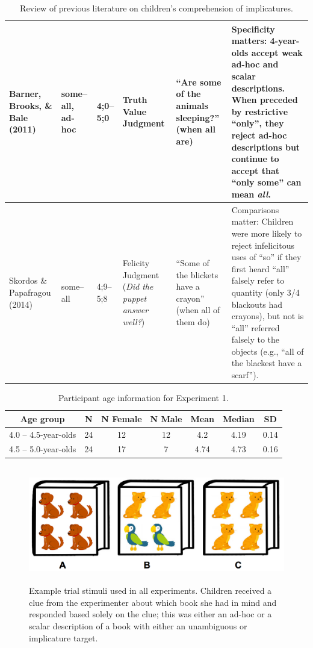 \documentclass[man]{apa2}
\begin{document}
{\begin{landscape}
\begin{table}[!ht]
\begin{tabular}{| p{2.2cm} | p{2cm} | p{1.69cm} | p{4.5cm} | p{5cm} | p{7.2cm} |}
Barner, Brooks, \& Bale (2011) & some--all, ad-hoc & 4;0--5;0 &Truth Value Judgment & ``Are some of the animals sleeping?'' (when all are) & Specificity matters: 4-year-olds accept weak ad-hoc and scalar descriptions. When preceded by restrictive ``only'', they reject ad-hoc descriptions but continue to accept that ``only some'' can mean \emph{all}.\\ \hline
\parbox[t]{2.2cm}{Skordos \&\\Papafragou (2014)} & some--all & 4;9--5;8 & Felicity Judgment (\textit{Did the puppet answer well?}) & ``Some of the blickets have a crayon'' (when all of them do)  & Comparisons matter: Children were more likely to reject infelicitous uses of ``so'' if they first heard ``all'' falsely refer to quantity (only 3/4 blackouts had crayons), but not is ``all'' referred falsely to the objects (e.g., ``all of the blackest have a scarf'').\\ \hline \end{tabular}
\caption{\label{tab:lit_review}Review of previous literature on children's comprehension of implicatures.}
\end{table}
\end{landscape}
\restoregeometry

\begin{table}[tb]
\centering
\begin{tabular}{ccccccc}
\hline
{\bf Age group} & {\bf N} & {\bf N Female} & {\bf N Male} & {\bf Mean} & {\bf Median} & {\bf SD} \\
\hline
4.0 -- 4.5-year-olds & 24 & 12 & 12 & 4.2 & 4.19 & 0.14 \\
4.5 -- 5.0-year-olds & 24 & 17 & 7 & 4.74 & 4.73 & 0.16\\
\hline
\end{tabular}
\caption{\label{tab:exp_1_demo}Participant age information for Experiment 1.}
\end{table}

\begin{figure}
 \begin{center}
  \includegraphics[height=2in]{figures/implicatures_demo_letters.png}
  \caption{\label{fig:demo} Example trial stimuli used in all experiments. Children received a clue from the experimenter about which book she had in mind and responded based solely on the clue; this was either an ad-hoc or a scalar description of a book with either an unambiguous or implicature target.}
 \end{center}
\end{figure}

}
\end{document}
